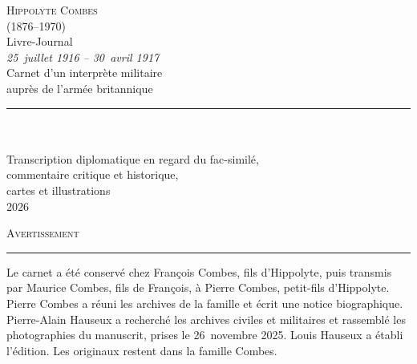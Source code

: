 
\thispagestyle{vide}
\renewcommand{\LJmois}{}\renewcommand{\LJfolio}{}
\begin{center}
\vspace*{12mm}
{\large\scshape Hippolyte Combes}\\[1mm]
{\small (1876--1970)}\\[14mm]
{\fontsize{30pt}{32pt}\selectfont Livre-Journal}\\[4.5mm]
{\large\itshape 25~juillet 1916 – 30~avril 1917}\\[8mm]
{\normalsize Carnet d'un interprète militaire\\ auprès de l'armée britannique}\\[11mm]
\rule{24mm}{0.4pt}\\[6mm]
{\Large{}}\\[3.5mm]
{\normalsize Transcription diplomatique en regard du fac-similé,\\[1mm]
commentaire critique et historique,\\[1mm]
cartes et illustrations}\\
\vfill
{\small 2026}
\end{center}
\LJpageimpaire
\thispagestyle{plain}
\vspace*{\fill}
\begin{center}
{\small\scshape Avertissement}\\[2mm]
\rule{16mm}{0.4pt}
\end{center}
\vspace{2mm}
\begin{center}\begin{minipage}{0.78\textwidth}\footnotesize\setlength{\parindent}{0pt}
Le carnet a été conservé chez François Combes, fils d'Hippolyte, puis transmis par Maurice Combes, fils de François, à Pierre Combes, petit-fils d'Hippolyte. Pierre Combes a réuni les archives de la famille et écrit une notice biographique. Pierre-Alain Hauseux a recherché les archives civiles et militaires et rassemblé les photographies du manuscrit, prises le 26~novembre 2025. Louis Hauseux a établi l'édition. Les originaux restent dans la famille Combes.\par\end{minipage}\end{center}
\LJpageimpaire
